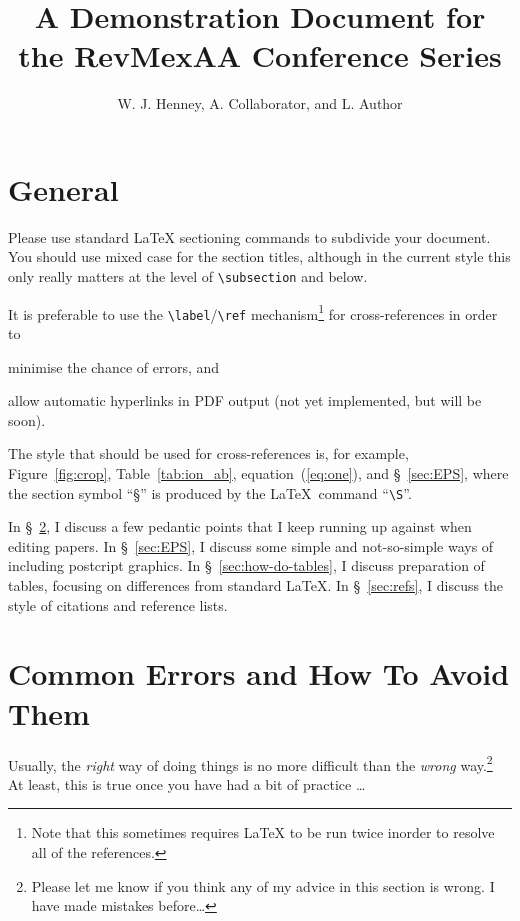 \documentclass[proceedings, preprint]{rmaa}
\title{A Demonstration Document for the RevMexAA Conference Series}
\author{
  W. J. Henney,\altaffilmark{1} 
  A. Collaborator,\altaffilmark{2}
  and L. Author\altaffilmark{2,3,4}}
\newcommand{\CS}[1]{\texttt{\textbackslash #1}}
\begin{document}
\maketitle


\section{General}
\label{sec:intro}

Please use standard \LaTeX{} sectioning commands to subdivide your
document. You should use mixed case for the section titles, although
in the current style this only really matters at the level of
\CS{subsection} and below. 

It is preferable to use the \CS{label}/\CS{ref}
mechanism\footnote{Note that this sometimes requires \LaTeX{} to be
  run twice inorder to resolve all of the references.} for
cross-references in order to
\begin{inparaenum}[(1)]
\item minimise the chance of errors, and 
\item allow automatic hyperlinks in PDF output (not yet implemented,
  but will be soon). 
\end{inparaenum}

The style that should be used for cross-references is, for example,
Figure~\ref{fig:crop}, Table~\ref{tab:ion_ab},
equation~(\ref{eq:one}), and \S~\ref{sec:EPS}, where the section
symbol ``\S'' is produced by the \LaTeX\ command ``\CS{S}''.

In \S~\ref{sec:errors}, I discuss a few pedantic points that I keep
running up against when editing papers. In \S~\ref{sec:EPS}, I discuss
some simple and not-so-simple ways of including postcript graphics. In
\S~\ref{sec:how-do-tables}, I discuss preparation of tables, focusing
on differences from standard \LaTeX{}. In \S~\ref{sec:refs}, I discuss
the style of citations and reference lists. 

\section{Common Errors and How To Avoid Them}
\label{sec:errors}

Usually, the \emph{right} way of doing things is no more difficult
than the \emph{wrong} way.\footnote{Please let me know if you think
  any of my advice in this section is wrong. I have made mistakes
  before\dots} At least, this is true once you have had a bit of
practice \dots
\end{document}
